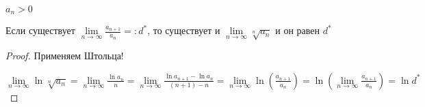 \begin{theorem}\slashns
	
	$a_n > 0$
	
	Если существует $\lim\limits_{n \to \infty} \frac{a_{n+1}}{a_n} =: d^*$, то существует и $\lim\limits_{n \to \infty} \sqrt[n]{a_n}$ и он равен $d^*$
\end{theorem}

\begin{proof}\slashns
	
	Применяем Штольца!
	
	$\lim\limits_{n \to \infty} \ln \sqrt[n]{a_n} = \lim\limits_{n \to \infty} \frac{\ln a_n}{n} = \lim\limits_{n \to \infty} \frac{\ln a_{n+1} - \ln a_n}{(n+1) - n} = \lim\limits_{n \to \infty} \ln (\frac{a_{n+1}}{a_n}) = \ln (\lim\limits_{n \to \infty} \frac{a_{n+1}}{a_n}) = \ln d^*$
	
\end{proof}

